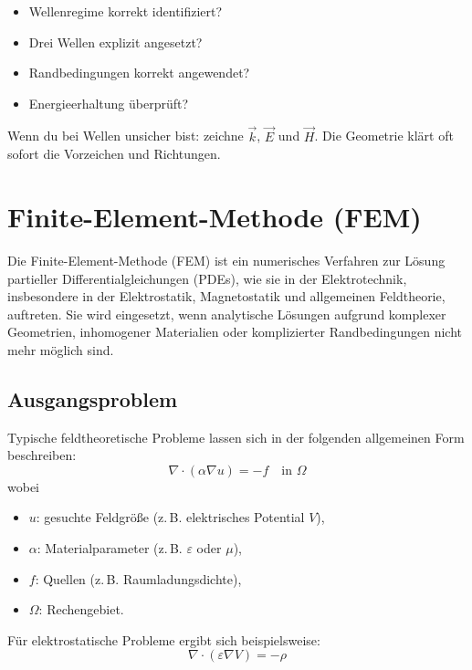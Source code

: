 \documentclass[a4paper]{article}
\newcommand{\E}{\vec E}
\newcommand{\Hf}{\vec H}
\begin{document}
\begin{checkitem}
\begin{itemize}
  \item Wellenregime korrekt identifiziert?
  \item Drei Wellen explizit angesetzt?
  \item Randbedingungen korrekt angewendet?
  \item Energieerhaltung überprüft?
\end{itemize}
\end{checkitem}

\begin{taktik}
Wenn du bei Wellen unsicher bist:
zeichne $\vec k$, $\E$ und $\Hf$.
Die Geometrie klärt oft sofort die Vorzeichen und Richtungen.
\end{taktik}
\section{Finite-Element-Methode (FEM)}

Die Finite-Element-Methode (FEM) ist ein numerisches Verfahren zur Lösung partieller Differentialgleichungen (PDEs), wie sie in der Elektrotechnik, insbesondere in der Elektrostatik, Magnetostatik und allgemeinen Feldtheorie, auftreten. Sie wird eingesetzt, wenn analytische Lösungen aufgrund komplexer Geometrien, inhomogener Materialien oder komplizierter Randbedingungen nicht mehr möglich sind.

\subsection{Ausgangsproblem}

Typische feldtheoretische Probleme lassen sich in der folgenden allgemeinen Form beschreiben:
\[
\nabla \cdot (\alpha \nabla u) = -f \quad \text{in } \Omega
\]
wobei
\begin{itemize}
    \item $u$: gesuchte Feldgröße (z.\,B. elektrisches Potential $V$),
    \item $\alpha$: Materialparameter (z.\,B. $\varepsilon$ oder $\mu$),
    \item $f$: Quellen (z.\,B. Raumladungsdichte),
    \item $\Omega$: Rechengebiet.
\end{itemize}

Für elektrostatische Probleme ergibt sich beispielsweise:
\[
\nabla \cdot (\varepsilon \nabla V) = -\rho
\]
\end{document}
